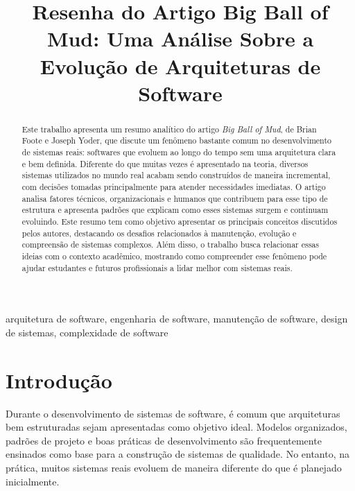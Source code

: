\documentclass[conference]{IEEEtran}
\begin{document}
\title{Resenha do Artigo Big Ball of Mud: Uma Análise Sobre a Evolução de Arquiteturas de Software}

\author{
}

\maketitle

\begin{abstract}
Este trabalho apresenta um resumo analítico do artigo \textit{Big Ball of Mud}, de Brian Foote e Joseph Yoder, que discute um fenômeno bastante comum no desenvolvimento de sistemas reais: softwares que evoluem ao longo do tempo sem uma arquitetura clara e bem definida. Diferente do que muitas vezes é apresentado na teoria, diversos sistemas utilizados no mundo real acabam sendo construídos de maneira incremental, com decisões tomadas principalmente para atender necessidades imediatas. O artigo analisa fatores técnicos, organizacionais e humanos que contribuem para esse tipo de estrutura e apresenta padrões que explicam como esses sistemas surgem e continuam evoluindo. Este resumo tem como objetivo apresentar os principais conceitos discutidos pelos autores, destacando os desafios relacionados à manutenção, evolução e compreensão de sistemas complexos. Além disso, o trabalho busca relacionar essas ideias com o contexto acadêmico, mostrando como compreender esse fenômeno pode ajudar estudantes e futuros profissionais a lidar melhor com sistemas reais.
\end{abstract}

\begin{IEEEkeywords}
arquitetura de software, engenharia de software, manutenção de software, design de sistemas, complexidade de software
\end{IEEEkeywords}

\section{Introdução}

Durante o desenvolvimento de sistemas de software, é comum que arquiteturas bem estruturadas sejam apresentadas como objetivo ideal. Modelos organizados, padrões de projeto e boas práticas de desenvolvimento são frequentemente ensinados como base para a construção de sistemas de qualidade. No entanto, na prática, muitos sistemas reais evoluem de maneira diferente do que é planejado inicialmente.
\end{document}
